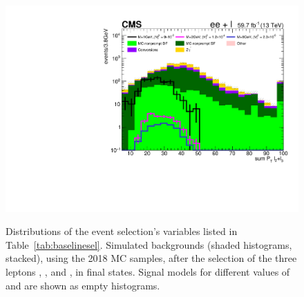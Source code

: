 \begin{figure}[h]
{  \includegraphics[width=.28\textwidth]{Figures/c6/selection/18/e_sum_Pt_L2L3__0.pdf}}\\
  \caption{Distributions of the event selection's variables listed in
    Table~\ref{tab:baselinesel}. Simulated backgrounds (shaded histograms, stacked),
    using the 2018 MC samples, 
    after the selection of the three leptons \lone, \ltwo, and \lthree,
    in \eex final states.
    Signal models for different values of \mhnl and \mixpar are shown
    as empty histograms.}
  \label{fig:selection_electrons}
\end{figure}


